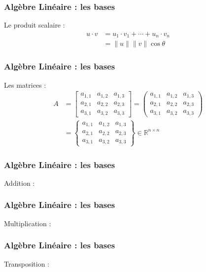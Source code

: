 \documentclass{formation}
\begin{document}
\begin{frame}
  \frametitle{Algèbre Linéaire : les bases}
  Le produit scalaire :
    \begin{align*}
      u\cdot v & = u_1\cdot v_1 + \dotsb + u_n \cdot v_n \\[4mm]
      & = \parallel u\parallel \parallel v\parallel \cos\theta
    \end{align*}
\end{frame}

\begin{frame}
  \frametitle{Algèbre Linéaire : les bases}
  Les matrices :
    \begin{align*}
      A & = 
      \begin{bmatrix}
        a_{1,1} & a_{1,2} & a_{1,3} \\
        a_{2,1} & a_{2,2} & a_{2,3} \\
        a_{3,1} & a_{3,2} & a_{3,3}
      \end{bmatrix} 
      =
      \begin{pmatrix}
        a_{1,1} & a_{1,2} & a_{1,3} \\
        a_{2,1} & a_{2,2} & a_{2,3} \\
        a_{3,1} & a_{3,2} & a_{3,3}
      \end{pmatrix} \\[4mm]
      & =
      \begin{Bmatrix}
        a_{1,1} & a_{1,2} & a_{1,3} \\
        a_{2,1} & a_{2,2} & a_{2,3} \\
        a_{3,1} & a_{3,2} & a_{3,3}
      \end{Bmatrix}
      \in \mathbb{R}^{n\times n}
    \end{align*}
\end{frame}

\begin{frame}
  \frametitle{Algèbre Linéaire : les bases}
  Addition :
\end{frame}


\begin{frame}
  \frametitle{Algèbre Linéaire : les bases}
  Multiplication :
  \begin{center}
  \end{center}
\end{frame}

\begin{frame}
  \frametitle{Algèbre Linéaire : les bases}
  Transposition :
\end{frame}
\end{document}
